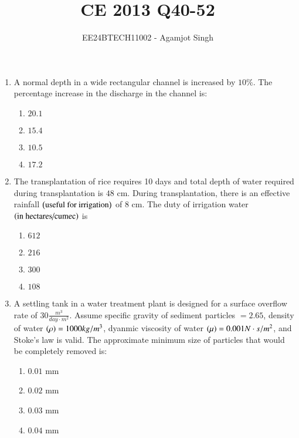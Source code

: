 \documentclass[journal,onecolumn]{IEEEtran}
\theoremstyle{remark}
\begin{document}

\vspace{3cm}

\title{CE 2013 Q40-52}
\author{EE24BTECH11002 - Agamjot Singh}
\maketitle

\renewcommand{\thefigure}{\theenumi}
\renewcommand{\thetable}{\theenumi}

\begin{enumerate}
    \item A normal depth in a wide rectangular channel is increased by $10\%$. The percentage increase in the discharge in the channel is:

	\begin{enumerate}
		\item $20.1$
		\item $15.4$
		\item $10.5$
		\item $17.2$
	\end{enumerate}

    \item The transplantation of rice requires 10 days and total depth of water required during transplantation is $48$ cm. During transplantation, there is an effective rainfall $\left(\text{useful for irrigation}\right)$ of $8$ cm. The duty of irrigation water $\left(\text{in hectares/cumec}\right)$ is

	\begin{enumerate}
		\item $612$
		\item $216$
		\item $300$
		\item $108$
	\end{enumerate}

    \item A settling tank in a water treatment plant is designed for a surface overflow rate of $30 \frac{m^3}{day\cdot m^2}$. Assume specific gravity of sediment particles $= 2.65$, density of water $\left(\rho\right) = 1000 kg/m^3$, dyanmic viscosity of water $\left(\mu\right) = 0.001 N\cdot s/m^2$, and Stoke's law is valid. The approximate minimum size of particles that would be completely removed is:

	\begin{enumerate}
		\item $0.01$ mm
		\item $0.02$ mm
		\item $0.03$ mm
		\item $0.04$ mm
	\end{enumerate}



\end{enumerate}
\end{document}
